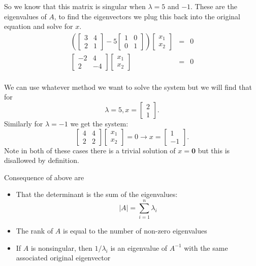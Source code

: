 So we know that this matrix is singular when $\lambda = 5$ and $-1$. 
These are the eigenvalues of $A$, to find the eigenvectors we plug this back into the original equation and solve for $x$. 
\[\begin{array}{rcl}
\left(\begin{bmatrix}3 & 4 \\ 2 & 1\end{bmatrix}-5\begin{bmatrix}1&0\\0&1\end{bmatrix}\right)\begin{bmatrix}x_1\\x_2\end{bmatrix} & = & 0\\
\begin{bmatrix}-2 & 4 \\ 2 & -4\end{bmatrix}\begin{bmatrix}x_1\\x_2\end{bmatrix} & = & 0\\
\end{array}\]

We can use whatever method we want to solve the system but we will find that for \[\lambda=5, x=\begin{bmatrix}2\\1\end{bmatrix}.\]
Similarly for $\lambda=-1$ we get the system:  
\[\begin{bmatrix}4 & 4 \\ 2 & 2\end{bmatrix}\begin{bmatrix}x_1\\x_2\end{bmatrix} = 0 \rightarrow x=\begin{bmatrix}1\\-1\end{bmatrix}.\]
Note in both of these cases there is a trivial solution of $x=\mathbf{0}$ but this is disallowed by definition. 

\begin{aside}
Consequence of above are 
\begin{itemize}
\item That the determinant is the sum of the eigenvalues: \[|A|=\sum_{i=1}^n \lambda_i\]
\item The rank of $A$ is equal to the number of non-zero eigenvalues
\item If $A$ is nonsingular, then $1/\lambda_i$ is an eigenvalue of $A^{-1}$ with the same associated original eigenvector
\end{itemize}
\end{aside}

